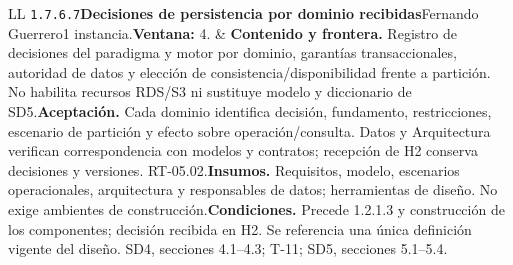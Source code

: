 \begin{longtable}{L{\tabcolsep\relax}L{\tabcolsep\relax}}
\texttt{1.\allowbreak{}7.\allowbreak{}6.\allowbreak{}7}\newline{}\textbf{Decisiones de persistencia por dominio recibidas}\newline{}Fernando Guerrero\newline{}1 instancia.\newline{}\textbf{Ventana:} 4. & \textbf{Contenido y frontera.} Registro de decisiones del paradigma y motor por dominio, garantías transaccionales, autoridad de datos y elección de consistencia/disponibilidad frente a partición. No habilita recursos RDS/S3 ni sustituye modelo y diccionario de SD5.\newline{}\textbf{Aceptación.} Cada dominio identifica decisión, fundamento, restricciones, escenario de partición y efecto sobre operación/consulta. Datos y Arquitectura verifican correspondencia con modelos y contratos; recepción de H2 conserva decisiones y versiones. RT-05.02.\newline{}\textbf{Insumos.} Requisitos, modelo, escenarios operacionales, arquitectura y responsables de datos; herramientas de diseño. No exige ambientes de construcción.\newline{}\textbf{Condiciones.} Precede 1.2.1.3 y construcción de los componentes; decisión recibida en H2. Se referencia una única definición vigente del diseño. SD4, secciones 4.1--4.3; T-11; SD5, secciones 5.1--5.4.\\\hline

\end{longtable}
